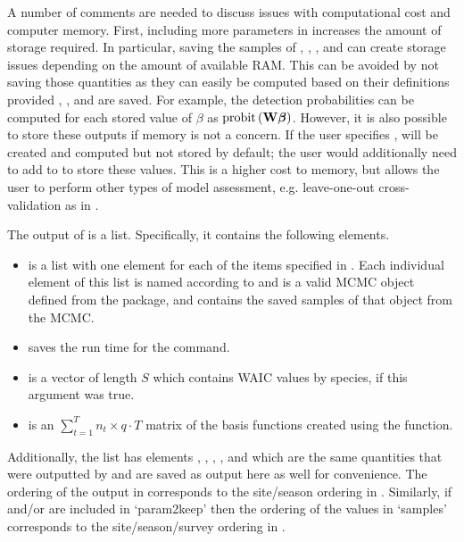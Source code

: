 A number of comments are needed to discuss issues with computational cost and computer memory.  First, including more parameters in  increases the amount of storage required. In particular, saving the samples of , , , and  can create storage issues depending on the amount of available RAM. This can be avoided by not saving those quantities as they can easily be computed based on their definitions provided , , and  are saved. For example, the detection probabilities  can be computed for each stored value of $\beta$ as $\text{probit}\left({\bf W} \mbox{\boldmath $\beta$} \right)$. However, it is also possible to store these outputs if memory is not a concern. If the user specifies ,  will be created and computed but not stored by default; the user would additionally need to add  to  to store these values. This is a higher cost to memory, but allows the user to perform other types of model assessment, e.g. leave-one-out cross-validation as in \cite{vehtari2017practical}.

The output of  is a list.  Specifically, it contains the following elements. 
\begin{itemize}
\item {} is a list with one element for each of the items specified in .  Each individual element of this list is named according to  and is a valid MCMC object defined from the  package, and contains the saved samples of that object from the MCMC.  
\item {} saves the run time for the  command.
\item {} is a vector of length $S$ which contains WAIC values by species, if this argument was true.
\item {} is an $\sum_{t=1}^T n_t \times q\cdot T$ matrix of the basis functions created using the  function.
\end{itemize}

Additionally, the list has elements , , , , and  which are the same quantities that were outputted by  and are saved as output here as well for convenience. The ordering of the output in  corresponds to the site/season ordering in . Similarly, if  and/or  are included in `param2keep' then the ordering of the values in `samples' corresponds to the site/season/survey ordering in .

